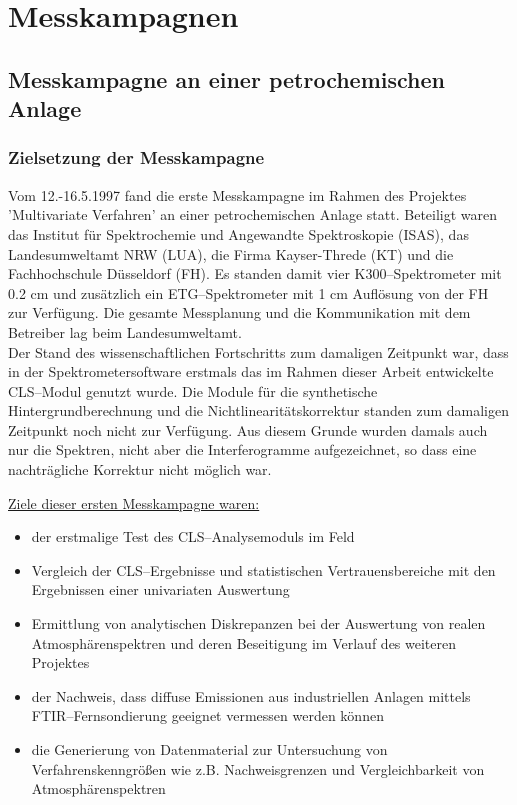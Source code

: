 \chapter{\label{messkampagnen}Messkampagnen}

\section{\label{raffinerie}Messkampagne an einer petrochemischen
Anlage}

\subsection{\label{raffziel}Zielsetzung der Messkampagne}

Vom 12.-16.5.1997 fand die erste Messkampagne im Rahmen des
Projektes 'Multivariate Verfahren' an einer petrochemischen Anlage
statt. Beteiligt waren das Institut für Spektrochemie und
Angewandte Spektroskopie (ISAS), das Landesumweltamt NRW (LUA),
die Firma Kayser-Threde (KT) und die Fachhochschule Düsseldorf
(FH). Es standen damit vier K300--Spektrometer mit 0.2 cm
und zusätzlich ein ETG--Spektrometer mit 1 cm Auflösung von
der FH zur Verfügung. Die gesamte Messplanung und die
Kommunikation mit dem Betreiber lag beim Landesumweltamt.\\

Der Stand des wissenschaftlichen Fortschritts zum damaligen
Zeitpunkt war, dass in der Spektrometersoftware erstmals das im
Rahmen dieser Arbeit entwickelte CLS--Modul genutzt wurde. Die
Module für die synthetische Hintergrundberechnung und die
Nichtlinearitätskorrektur standen zum damaligen Zeitpunkt noch
nicht zur Verfügung. Aus diesem Grunde wurden damals auch nur die
Spektren, nicht aber die Interferogramme aufgezeichnet, so dass
eine nachträgliche Korrektur nicht möglich war.\\


\underline{Ziele dieser ersten Messkampagne waren:}\\

\begin{itemize}
  \item der erstmalige Test des CLS--Analysemoduls im Feld
  \item Vergleich der CLS--Ergebnisse und statistischen
  Vertrauensbereiche mit den Ergebnissen einer univariaten
  Auswertung
  \item Ermittlung von analytischen Diskrepanzen bei der Auswertung von
  realen Atmosphärenspektren und deren Beseitigung im Verlauf des
  weiteren Projektes
  \item der Nachweis, dass diffuse Emissionen aus industriellen
  Anlagen mittels FTIR--Fernsondierung geeignet vermessen werden
  können
  \item die Generierung von Datenmaterial zur Untersuchung von
  Verfahrenskenngrö{\ss}en wie z.B. Nachweisgrenzen und
  Vergleichbarkeit von Atmosphärenspektren
\end{itemize}

